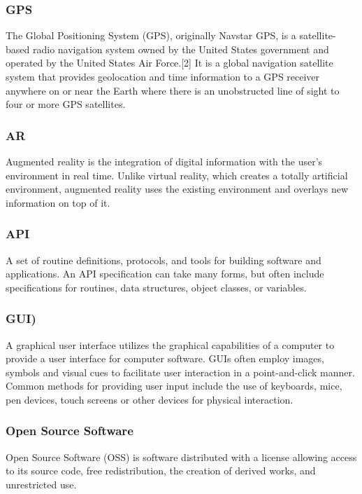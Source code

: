 \subsubsection*{GPS}

The Global Positioning System (GPS), originally Navstar GPS, is a satellite-based radio navigation system owned by the United States government and operated by the United States Air Force.[2] It is a global navigation satellite system that provides geolocation and time information to a GPS receiver anywhere on or near the Earth where there is an unobstructed line of sight to four or more GPS satellites.

\subsubsection*{AR}

Augmented reality is the integration of digital information with the user's environment in real time. Unlike virtual reality, which creates a totally artificial environment, augmented reality uses the existing environment and overlays new information on top of it.

\subsubsection*{API}

A set of routine definitions, protocols, and tools for building software and applications. An API specification can take many forms, but often include specifications for routines, data structures, object classes, or variables.

\subsubsection*{GUI)}

A graphical user interface utilizes the graphical capabilities of a computer to provide a
user interface for computer software. GUIs often employ images, symbols and visual cues
to facilitate user interaction in a point-and-click manner. Common methods for providing
user input include the use of keyboards, mice, pen devices, touch screens or other devices
for physical interaction.

\subsubsection*{Open Source Software}

Open Source Software (OSS) is software distributed with a license allowing access to its
source code, free redistribution, the creation of derived works, and unrestricted use.

